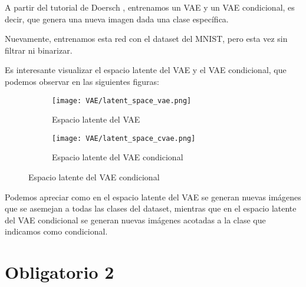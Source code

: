 \documentclass[11pt]{article}
\begin{document}
A partir del tutorial de Doersch \cite{vae}, entrenamos un VAE y un VAE condicional, es decir, que genera una nueva imagen dada una clase específica.

Nuevamente, entrenamos esta red con el dataset del MNIST, pero esta vez sin filtrar ni binarizar.

Es interesante visualizar el espacio latente del VAE y el VAE condicional, que podemos observar en las siguientes figuras:

\begin{figure}[h]
\begin{subfigure}[h]{0.45\linewidth}
    \centering
    \texttt{[image: VAE/latent\_space\_vae.png]}
    \caption{Espacio latente del VAE}
    \label{fig:vae_latent_space}
\end{subfigure}
\begin{subfigure}[h]{0.45\linewidth}
    \centering
    \texttt{[image: VAE/latent\_space\_cvae.png]}
    \caption{Espacio latente del VAE condicional}
    \label{fig:cvae_latent_space}
\end{subfigure}
\end{figure}

Podemos apreciar como en el espacio latente del VAE se generan nuevas imágenes que se asemejan a todas las clases del dataset, mientras que en el espacio latente del VAE condicional se generan nuevas imágenes acotadas a la clase que indicamos como condicional.
\newpage
\section{Obligatorio 2}

\newpage



\end{document}

